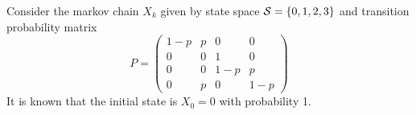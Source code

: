 \ifspanish

\else

Consider the markov chain $X_k$ given by state space ${\cal S} = \{0,1,2,3\}$ and transition probability matrix
\[P = \begin{pmatrix}
      1-p & p & 0   & 0 \\
      0   & 0 & 1   & 0  \\
      0   & 0 & 1-p & p   \\
      0   & p & 0   & 1-p 
\end{pmatrix}\]
It is known that the initial state is $X_0=0$ with probability 1.



